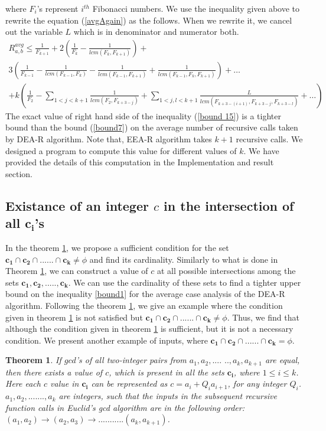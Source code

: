 \documentclass[pdflatex,sn-mathphys-num]{sn-jnl}%
\theoremstyle{thmstyleone}%
\newtheorem{theorem}{Theorem}%
\theoremstyle{thmstyletwo}%
\theoremstyle{thmstylethree}%
\begin{document}
where $F_i$'s represent $i^{th}$ Fibonacci numbers. We use the inequality given above to rewrite the equation (\ref{avgAgain}) as the follows. When we rewrite it, we cancel out the variable $L$ which is in denominator and numerator both.
\begin{multline}\label{bound 15}
R_{a,b}^{avg}\le\frac{1}{F_{k+1}}+2\left(\frac{1}{F_k}-\frac{1}{lcm(F_k,F_{k+1})}\right)+\\3\left(\frac{1}{F_{k-1}}-\frac{1}{lcm(F_{k-1},F_k)}-\frac{1}{lcm(F_{k-1},F_{k+1})}+\frac{1}{lcm(F_{k-1},F_k,F_{k+1})}\right)
+\ldots \\+k\left(\frac{1}{F_2}-\sum_{1<j<k+1}\frac{1}{lcm(F_2,F_{k+3-j})}+
\sum_{1<j,l<k+1}\frac{L}{lcm(F_{k+3-{(i+1)}},F_{k+3-{j}},F_{k+3-l})}+\ldots\right)\end{multline}
The exact value of right hand side of the inequality (\ref{bound 15}) is a tighter bound than the bound (\ref{bound7}) on the average number of recursive calls taken by DEA-R algorithm. Note that, EEA-R algorithm takes $k+1$ recursive calls. We designed a program to compute this value for different values of $k$. We have provided the details of this computation in the Implementation and result section. 

 \subsection{Existance of an integer $c$ in the intersection of all $\mathbf{c_i}$'s}\label{SecEXC}  In the theorem \ref{theo11}, we propose a sufficient condition for the set $\mathbf{c_1} \cap \mathbf{c_2} \cap ......\cap \mathbf{c_k} \ne \phi $ and find its cardinality. Similarly to what is done in Theorem \ref{theo11}, we can construct a value of $c$ at all possible intersections among the sets $\mathbf{c_1},\mathbf{c_2},.....,\mathbf{c_k}$. We can use the cardinality of these sets to find a tighter upper bound on the inequality \ref{bound1} for the average case analysis of the DEA-R algorithm. Following the theorem \ref{theo11}, we give an example where the condition given in theorem \ref{theo11} is not satisfied but $\mathbf{c_1} \cap \mathbf{c_2} \cap ......\cap \mathbf{c_k} \ne \phi $. Thus, we find that although the condition given in theorem \ref{theo11} is sufficient, but it is not a necessary condition. We present another example of inputs, where $\mathbf{c_1} \cap \mathbf{c_2} \cap ......\cap \mathbf{c_k} = \phi $. \newline\begin{theorem} \label{theo11}
   If $gcd$'s of all two-integer pairs from  $a_1,a_2,....$ $..,a_k,a_{k+1}$ are equal,  then there exists a value of $c$, which is present in all the sets $\mathbf{c_i}$, where $1\le i \le k$. Here each $c$ value in $\mathbf{c_i}$ can be represented as $c=a_i+Q_ia_{i+1}$, for any integer $Q_i$.  $a_1,a_2,.......,a_k$ are integers, such that the inputs in the subsequent recursive function calls in Euclid's gcd algorithm  are in the following order:
$(a_1,a_2)\to (a_2,a_3) \to ...........(a_k,a_{k+1})$.
\end{theorem}
\end{document}
